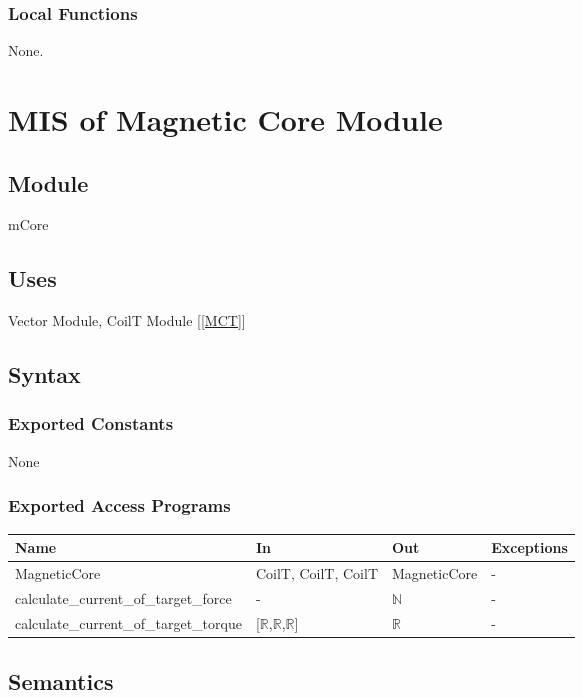 \documentclass[12pt, titlepage]{article}
\begin{document}
\subsubsection{Local Functions}
None.



\section{MIS of Magnetic Core Module} \label{MMC}

\subsection{Module}
mCore

\subsection{Uses}
Vector Module, CoilT Module [\ref{MCT}]

\subsection{Syntax}

\subsubsection{Exported Constants}
None
\subsubsection{Exported Access Programs}

\begin{center}
\begin{tabular}{p{6cm} p{4cm} p{3cm} p{2cm}}
\hline
\textbf{Name} & \textbf{In} & \textbf{Out} & \textbf{Exceptions} \\
\hline
MagneticCore  & CoilT, CoilT, CoilT & MagneticCore   & - \\
\hline
calculate\_current\_of\_target\_force & - & $\mathbb{N}$  & -  \\
\hline
calculate\_current\_of\_target\_torque & [$\mathbb{R}$,$\mathbb{R}$,$\mathbb{R}$] & $\mathbb{R}$  & -  \\
\hline
\end{tabular}
\end{center}

\subsection{Semantics}
\end{document}
